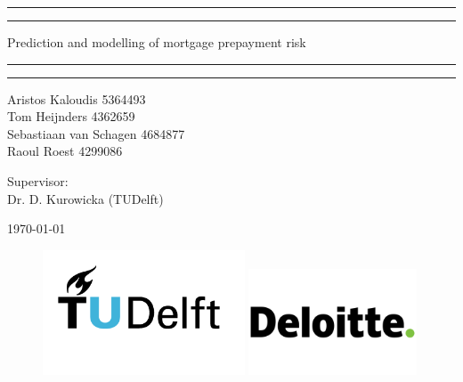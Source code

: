 \begin{titlepage}
    \vspace{\fill}
    \centering
    
    \par\noindent\rule{\textwidth}{0.4pt}
    \par\noindent\rule{\textwidth}{0.4pt}

    \vspace{0.5cm}
    
    {
        \Huge 
        Prediction and modelling of mortgage prepayment risk
    }

    \vspace{0.5cm}

    \par\noindent\rule{\textwidth}{0.4pt}
    \par\noindent\rule{\textwidth}{0.4pt}
    
    \vspace{3cm}

    {
        \large 
        Aristos Kaloudis 5364493 \\
        Tom Heijnders 4362659 \\
        Sebastiaan van Schagen 4684877 \\
        Raoul Roest 4299086
    }

    \vspace{1cm}

    {
        \large Supervisor:\\ 
        Dr. D. Kurowicka (TUDelft)
    }
    
    \vspace{1cm}

    \today

    \vspace{3cm}
    
    \begin{figure}[H]    
        \centering
        \begin{minipage}{0.4\textwidth}
            \includegraphics[width=6cm]{Figures/TU_Delft_logo_RGB.png}
        \end{minipage}
        \hfill
        \begin{minipage}{0.4\textwidth}
            \includegraphics[width=5cm]{Figures/Logo_Deloitte.png}
        \end{minipage}
    \end{figure}

    \vfill

\end{titlepage}
